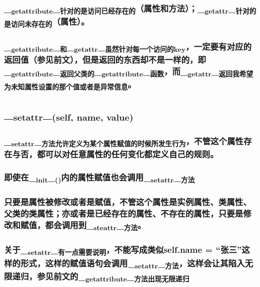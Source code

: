 \documentclass[11pt]{article}
\begin{document}
\subsubsection{\_\textsubscript{getattribute}\_\textsubscript{针对的是访问已经存在的}（属性和方法）；\_\textsubscript{getattr}\_\textsubscript{针对的是访问未存在的}（属性）。}
\label{sec:org7995a82}
\subsubsection{\_\textsubscript{getattribute}\_\textsubscript{和}\_\textsubscript{getattr}\_\textsubscript{虽然针对每一个访问的key}，一定要有对应的返回值（参见前文），但是返回的东西却不是一样的，即\_\textsubscript{getattribute}\_\textsubscript{返回父类的}\_\textsubscript{getattribute}\_\textsubscript{函数}，而\_\textsubscript{getattr}\_\textsubscript{返回我希望为未知属性设置的那个值或者是异常信息}。}
\label{sec:org28c9065}
\subsection{\_\textsubscript{setattr}\_\textsubscript{(self, name, value)}}
\label{sec:org8afa995}
\subsubsection{\_\textsubscript{setattr}\_\textsubscript{方法允许定义为某个属性赋值的时候所发生行为}，不管这个属性存在与否，都可以对任意属性的任何变化都定义自己的规则。}
\label{sec:org59d808c}
\subsubsection{即使在\_\textsubscript{init}\_\textsubscript{()}内的属性赋值也会调用\_\textsubscript{setattr}\_\textsubscript{方法}}
\label{sec:org02fa648}
\subsubsection{只要是属性被修改或者是赋值，不管这个属性是实例属性、类属性、父类的类属性；亦或者是已经存在的属性、不存在的属性，只要是修改和赋值，都会调用到\_\textsubscript{steattr}\_\textsubscript{方法}。}
\label{sec:orgb35972a}
\subsubsection{关于\_\textsubscript{setattr}\_\textsubscript{有一点需要说明}，不能写成类似self.name = “张三”这样的形式，这样的赋值语句会调用\_\textsubscript{setattr}\_\textsubscript{方法}，这样会让其陷入无限递归，参见前文的\_\textsubscript{getattribute}\_\textsubscript{方法出现无限递归}}
\label{sec:orgbf5a25a}
\end{document}
